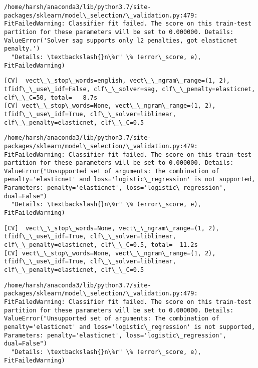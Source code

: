 \documentclass[11pt]{article}
\begin{document}
    \begin{Verbatim}[commandchars=\\\{\}]
/home/harsh/anaconda3/lib/python3.7/site-packages/sklearn/model\_selection/\_validation.py:479: FitFailedWarning: Classifier fit failed. The score on this train-test partition for these parameters will be set to 0.000000. Details: 
ValueError('Solver sag supports only l2 penalties, got elasticnet penalty.')
  "Details: \textbackslash{}n\%r" \% (error\_score, e), FitFailedWarning)

    \end{Verbatim}

    \begin{Verbatim}[commandchars=\\\{\}]
[CV]  vect\_\_stop\_words=english, vect\_\_ngram\_range=(1, 2), tfidf\_\_use\_idf=False, clf\_\_solver=sag, clf\_\_penalty=elasticnet, clf\_\_C=50, total=   8.7s
[CV] vect\_\_stop\_words=None, vect\_\_ngram\_range=(1, 2), tfidf\_\_use\_idf=True, clf\_\_solver=liblinear, clf\_\_penalty=elasticnet, clf\_\_C=0.5 

    \end{Verbatim}

    \begin{Verbatim}[commandchars=\\\{\}]
/home/harsh/anaconda3/lib/python3.7/site-packages/sklearn/model\_selection/\_validation.py:479: FitFailedWarning: Classifier fit failed. The score on this train-test partition for these parameters will be set to 0.000000. Details: 
ValueError("Unsupported set of arguments: The combination of penalty='elasticnet' and loss='logistic\_regression' is not supported, Parameters: penalty='elasticnet', loss='logistic\_regression', dual=False")
  "Details: \textbackslash{}n\%r" \% (error\_score, e), FitFailedWarning)

    \end{Verbatim}

    \begin{Verbatim}[commandchars=\\\{\}]
[CV]  vect\_\_stop\_words=None, vect\_\_ngram\_range=(1, 2), tfidf\_\_use\_idf=True, clf\_\_solver=liblinear, clf\_\_penalty=elasticnet, clf\_\_C=0.5, total=  11.2s
[CV] vect\_\_stop\_words=None, vect\_\_ngram\_range=(1, 2), tfidf\_\_use\_idf=True, clf\_\_solver=liblinear, clf\_\_penalty=elasticnet, clf\_\_C=0.5 

    \end{Verbatim}

    \begin{Verbatim}[commandchars=\\\{\}]
/home/harsh/anaconda3/lib/python3.7/site-packages/sklearn/model\_selection/\_validation.py:479: FitFailedWarning: Classifier fit failed. The score on this train-test partition for these parameters will be set to 0.000000. Details: 
ValueError("Unsupported set of arguments: The combination of penalty='elasticnet' and loss='logistic\_regression' is not supported, Parameters: penalty='elasticnet', loss='logistic\_regression', dual=False")
  "Details: \textbackslash{}n\%r" \% (error\_score, e), FitFailedWarning)

    \end{Verbatim}
\end{document}
